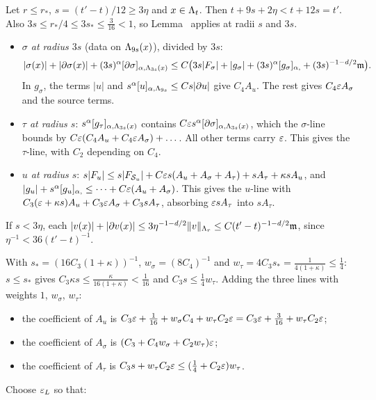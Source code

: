 \begin{detail}
\begin{step}
\end{step}
\begin{step}
Let $r\le r_*$, $s=(t'-t)/12\ge3\eta$ and $x\in\Lambda_t$. Then $t+9s+2\eta<t+12s=t'$. Also $3s\le r_*/4\le3s_*\le\frac3{16}<1$, so Lemma~ applies at radii $s$ and $3s$.
\begin{itemize}
\item \emph{$\sigma$ at radius $3s$} (data on $\Lambda_{9s}(x)$), divided by $3s$:
\[
|\sigma(x)|+|\partial\sigma(x)|+(3s)^\alpha[\partial\sigma]_{\alpha,\Lambda_{3s}(x)}\le C\big(3s|F_\sigma|+|g_\sigma|+(3s)^\alpha[g_\sigma]_{\alpha,}+(3s)^{-1-d/2}\mathfrak m\big).
\]
In $g_\sigma$, the terms $|u|$ and $s^\alpha[u]_{\alpha,\Lambda_{9s}}\le Cs|\partial u|$ give $C_4A_u$. The rest gives $C_4\varepsilon A_\sigma$ and the source terms.
\item \emph{$\tau$ at radius $s$}: $s^\alpha[g_\tau]_{\alpha,\Lambda_{3s}(x)}$ contains $C\varepsilon s^\alpha[\partial\sigma]_{\alpha,\Lambda_{3s}(x)}$, which the $\sigma$-line bounds by $C\varepsilon(C_4A_u+C_4\varepsilon A_\sigma)+\dots$. All other terms carry $\varepsilon$. This gives the $\tau$-line, with $C_2$ depending on $C_4$.
\item \emph{$u$ at radius $s$}: $s|F_u|\le s|F_{\mathcal S_u}|+C\varepsilon s(A_u+A_\sigma+A_\tau)+sA_\tau+\kappa sA_u$, and $|g_u|+s^\alpha[g_u]_{\alpha,}\le\dots+C\varepsilon(A_u+A_\sigma)$. This gives the $u$-line with $C_3(\varepsilon+\kappa s)A_u+C_3\varepsilon A_\sigma+C_3sA_\tau$, absorbing $\varepsilon sA_\tau$ into $sA_\tau$.
\end{itemize}
If $s<3\eta$, each $|v(x)|+|\partial v(x)|\le3\eta^{-1-d/2}\|v\|_{\Lambda_r}\le C(t'-t)^{-1-d/2}\mathfrak m$, since $\eta^{-1}<36(t'-t)^{-1}$.
\end{step}
\begin{step}
With $s_*=(16C_3(1+\kappa))^{-1}$, $w_\sigma=(8C_4)^{-1}$ and $w_\tau=4C_3s_*=\frac1{4(1+\kappa)}\le\frac14$: $s\le s_*$ gives $C_3\kappa s\le\frac\kappa{16(1+\kappa)}<\frac1{16}$ and $C_3s\le\frac14w_\tau$. Adding the three lines with weights $1$, $w_\sigma$, $w_\tau$:
\begin{itemize}
\item the coefficient of $A_u$ is $C_3\varepsilon+\frac1{16}+w_\sigma C_4+w_\tau C_2\varepsilon=C_3\varepsilon+\frac3{16}+w_\tau C_2\varepsilon$;
\item the coefficient of $A_\sigma$ is $(C_3+C_4w_\sigma+C_2w_\tau)\varepsilon$;
\item the coefficient of $A_\tau$ is $C_3s+w_\tau C_2\varepsilon\le(\frac14+C_2\varepsilon)w_\tau$.
\end{itemize}
Choose $\varepsilon_L$ so that:
\begin{itemize}

\end{itemize}
\end{step}
\end{detail}
